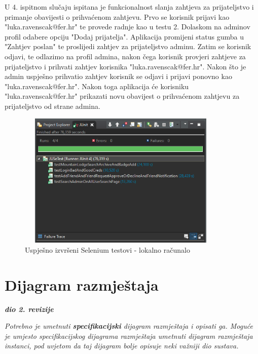  		U 4. ispitnom slučaju ispitana je funkcionalnost slanja zahtjeva za prijateljstvo i primanje obavijesti o prihvaćenom zahtjevu. Prvo se korisnik prijavi kao "luka.ravenscak@fer.hr" te provede radnje kao u testu 2. Dolaskom na adminov profil odabere opciju "Dodaj prijatelja". Aplikacija promijeni status gumba u "Zahtjev poslan" te proslijedi zahtjev za prijateljstvo adminu. Zatim se korisnik odjavi, te odlazimo na profil admina, nakon čega korisnik provjeri zahtjeve za prijateljstvo i prihvati zahtjev korisnika "luka.ravenscak@fer.hr".
 		Nakon što je admin uspješno prihvatio zahtjev korisnik se odjavi i prijavi ponovno kao "luka.ravenscak@fer.hr". Nakon toga aplikacija će korisniku "luka.ravenscak@fer.hr" prikazati novu obavijest o prihvaćenom zahtjevu za prijateljstvo od strane admina. 
 		
		
		\begin{figure}[H]
			\includegraphics[scale=0.6, height=65mm, width=100mm]{slike/test_results.png} %
			\centering
			\caption{Uspješno izvršeni Selenium testovi - lokalno računalo}
			\label{fig:test_results}
		\end{figure}
		
			\eject 
		
		
		\section{Dijagram razmještaja}
			
			\textbf{\textit{dio 2. revizije}}
			
			 \textit{Potrebno je umetnuti \textbf{specifikacijski} dijagram razmještaja i opisati ga. Moguće je umjesto specifikacijskog dijagrama razmještaja umetnuti dijagram razmještaja instanci, pod uvjetom da taj dijagram bolje opisuje neki važniji dio sustava.}
			
			\eject 
		
